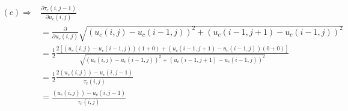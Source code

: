 \documentclass{paper}
\begin{document}
\begin{align}
(c) \Longrightarrow
	& \frac{\partial{\tau_{c}\left(i,j-1\right)}}{\partial u_{c}\left(i,j\right)} \nonumber \\
	&= \frac{\partial}{\partial{u_{c}\left(i,j\right)}} \sqrt{ \left(u_{c}(i,j)-u_{c}(i-1,j)\right)^2 + \left(u_{c}(i-1,j+1) - u_{c}(i-1,j)\right)^2} \nonumber \\
	&=  \frac{1}{2} \frac{2 [\left(u_{c}(i,j)-u_{c}(i-1,j)\right)(1 + 0) + \left(u_{c}(i-1,j+1) - u_{c}(i-1,j)\right)(0+0)]}{\sqrt{ \left(u_{c}(i,j)-u_{c}(i-1,j)\right)^2 + \left(u_{c}(i-1,j+1) - u_{c}(i-1,j)\right)^2}} \nonumber \\
	&= \frac{1}{2} \frac{2 \left(u_{c}(i,j)\right)-u_{c} \left(i,j-1\right)}{\tau_{c}\left(i,j\right)} \nonumber \\			
	&= \frac{\left(u_{c}(i,j)\right)-u_{c} \left(i,j-1\right)}{\tau_{c}\left(i,j\right)}
\end{align}
\end{document}
